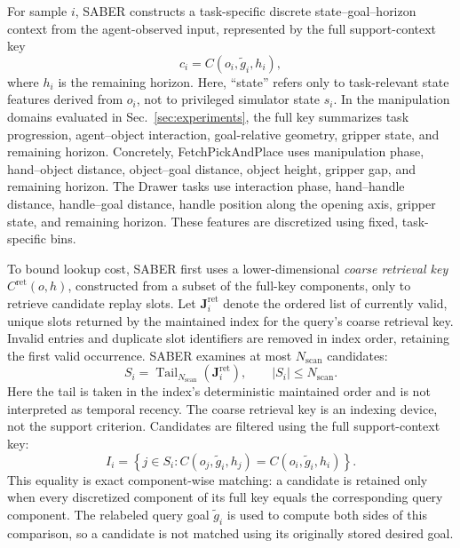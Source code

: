 \documentclass[letterpaper]{article}
\begin{document}
For sample \(i\), SABER constructs a task-specific discrete
state--goal--horizon context from the agent-observed input, represented
by the full support-context key
\begin{equation}
c_i=C(o_i,\tilde g_i,h_i),
\end{equation}
where \(h_i\) is the remaining horizon. Here, ``state'' refers only to
task-relevant state features derived from \(o_i\), not to privileged
simulator state \(s_i\). In the manipulation domains
evaluated in Sec.~\ref{sec:experiments}, the full key summarizes task progression,
agent--object interaction, goal-relative geometry, gripper state, and
remaining horizon.  Concretely, FetchPickAndPlace uses manipulation
phase, hand--object distance, object--goal distance, object height,
gripper gap, and remaining horizon.  The Drawer tasks use interaction
phase, hand--handle distance, handle--goal distance, handle position
along the opening axis, gripper state, and remaining horizon.  These
features are discretized using fixed, task-specific bins.

To bound lookup cost, SABER first uses a lower-dimensional
\emph{coarse retrieval key} \(C^{\mathrm{ret}}(o,h)\), constructed
from a subset of the full-key components, only to retrieve candidate
replay slots. Let \(\mathbf J_i^{\mathrm{ret}}\) denote the ordered
list of currently valid, unique slots returned by the maintained index
for the query's coarse retrieval key. Invalid entries and duplicate
slot identifiers are removed in index order, retaining the first valid
occurrence. SABER examines at most \(N_{\mathrm{scan}}\) candidates:
\begin{equation}
S_i=
\operatorname{Tail}_{N_{\mathrm{scan}}}
\left(\mathbf J_i^{\mathrm{ret}}\right),
\qquad |S_i|\leq N_{\mathrm{scan}}.
\end{equation}
Here the tail is taken in the index's deterministic maintained order
and is not interpreted as temporal recency.
The coarse retrieval key is an indexing device, not the support
criterion.  Candidates are filtered using the full support-context
key:
\begin{equation}
I_i=
\left\{
j\in S_i:
C(o_j,\tilde g_i,h_j)
=C(o_i,\tilde g_i,h_i)
\right\}.
\end{equation}
This equality is exact component-wise matching: a candidate is
retained only when every discretized component of its full key equals
the corresponding query component.  The relabeled query goal
\(\tilde g_i\) is used to compute both sides of this comparison, so a
candidate is not matched using its originally stored desired goal.
\end{document}
